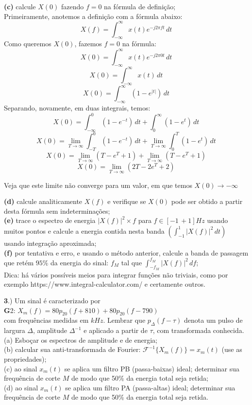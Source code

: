 \documentclass[10pt, a4paper]{article}
\begin{document}
{\textbf{(c)}} calcule $X(0)$ fazendo $f = 0$ na fórmula de definição;\\
Primeiramente, anotemos a definição com a fórmula abaixo:
\[X(f) = \int_{-\infty}^{\infty} x(t) e^{-j2\pi ft}\,dt\]
Como queremos $X(0)$, fazemos $f = 0$ na fórmula:
\[X(0) = \int_{-\infty}^{\infty} x(t) e^{-j2\pi 0t}\,dt\]
\[X(0) = \int_{-\infty}^{\infty} x(t)\,dt\]
\[X(0) = \int_{-\infty}^{\infty} (1 - e^{|t|})\,dt\]
Separando, novamente, em duas integrais, temos:
\[X(0) = \int_{-\infty}^{0} (1 - e^{-t})\,dt + \int_{0}^{\infty} (1 - e^{t})\,dt\]
\[X(0) = \lim_{T\to\infty}\int_{-T}^{0} (1 - e^{-t})\,dt + \lim_{T\to\infty}\int_{0}^{T} (1 - e^{t})\,dt\]
\[X(0) = \lim_{T\to\infty}(T - e^{T} + 1) + \lim_{T\to\infty}(T - e^{T} + 1)\]
\[X(0) = \lim_{T\to\infty}(2T - 2e^{T} + 2)\]

Veja que este limite não converge para um valor, em que temos $X(0) \to -\infty$

\vspace{\baselineskip}

{\textbf{(d)}} calcule analiticamente $X(f)$ e verifique se $X(0)$ pode ser obtido a partir desta fórmula sem indeterminações;\\
{\textbf{(e)}} trace o espectro de energia $|X(f)|^{2} \times f$ para $f \in [-1\,+ 1]Hz$ usando muitos pontos e calcule a energia contida nesta banda $(\int_{-1}^{1} |X(f)|^{2}\,dt)$ usando integração aproximada;\\
{\textbf{(f)}} por tentativa e erro, e usando o método anterior, calcule a banda de passagem que retém $95\%$ da energia do sinal: $f_{M}$ tal que $\int_{-f_{M}}^{f_{M}} |X(f)|^{2}\,df$;\\
Dica: há vários possíveis meios para integrar funções não triviais, como por exemplo https://www.integral-calculator.com/ e certamente outros.

\vspace{\baselineskip}
{\textbf 3.)} Um sinal é caracterizado por\\
{\textbf G2:} $ X_{m}(f) = 80p_{20}(f + 810) + 80p_{20}(f - 790) $\\
com frequências medidas em $kHz$. Lembrar que $p_{\Delta}(f - \tau)$ denota um pulso de largura $\Delta$, amplitude $\Delta^{-1}$ e aplicado a partir de $\tau$, com transformada conhecida.\\
(a) Esboçar os espectros de amplitude e de energia;\\
(b) calcular sua anti-transformada de Fourier: $\mathcal{F}^{-1} \{X_{m}(f)\} = x_{m}(t)$ (use as propriedades);\\
(c) ao sinal $x_{m}(t)$ se aplica um filtro PB (passa-baixas) ideal; determinar sua frequência de corte $M$ de modo que 50\% da energia total seja retida;\\
(d) ao sinal $x_{m}(t)$ se aplica um filtro PA (passa-altas) ideal; determinar sua frequência de corte $M$ de modo que 50\% da energia total seja retida.
\end{document}
